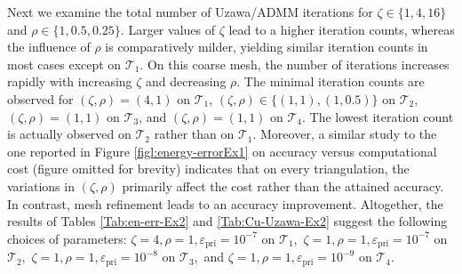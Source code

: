\documentclass[a4paper,11pt]{article}
\theoremstyle{definition}
\theoremstyle{remark}
\numberwithin{equation}{section}
\newcommand{\calT}{\mathcal{T}}
\begin{document}
\begin{table}[htb]
\centering
{}
\caption{Total number of Uzawa/ADMM iterations on the three triangulations and for various choices of the Uzawa/ADMM parameters: $\zeta\in\{1,4,16\}$, $\rho\in\{1,0.5,0.25\}$, $\varepsilon_{\text{pri}} \in \{10^{-6},10^{-7},10^{-8},10^{-9}\}$.}
\label{Tab:Cu-Uzawa-Ex2}
\end{table}


Next we examine the total number of Uzawa/ADMM iterations for $\zeta \in \{1,4,16\}$ and $\rho \in \{1,0.5,0.25\}$. Larger values of $\zeta$ lead to a higher iteration counts, whereas the influence of $\rho$ is comparatively milder, yielding similar iteration counts in most cases except on $\mathcal{T}_1$. On this coarse mesh, the number of iterations increases rapidly with increasing $\zeta$ and decreasing $\rho$. The minimal iteration counts are observed for $(\zeta,\rho) = (4,1)$ on $\mathcal{T}_1$, $(\zeta,\rho) \in\{(1,1),(1,0.5)\}$ on $\mathcal{T}_2$,   $(\zeta,\rho) = (1,1)$ on $\mathcal{T}_3$, and $(\zeta,\rho) = (1,1)$  on $\mathcal{T}_4$. The lowest iteration count is actually observed on $\mathcal{T}_2$ rather than on $\mathcal{T}_1$. 
Moreover, a similar study to the one reported in Figure \ref{figl:energy-errorEx1}  on accuracy versus computational cost (figure omitted for brevity) indicates that on every triangulation, the variations in $(\zeta,\rho)$ primarily affect the cost rather than the attained accuracy. In contrast, mesh refinement leads to an accuracy improvement. 
Altogether, the results of Tables \ref{Tab:en-err-Ex2} and \ref{Tab:Cu-Uzawa-Ex2}  suggest the following choices of parameters: $\zeta=4, \rho=1,  \varepsilon_{\text{pri}} = 10^{-7}$  on $\calT_1,$ $\zeta=1, \rho=1 ,  \varepsilon_{\text{pri}} = 10^{-7}$ on $\calT_2,$ $\zeta=1, \rho=1 ,  \varepsilon_{\text{pri}} = 10^{-8}$ on $\calT_3,$   and $\zeta=1, \rho=1,  \varepsilon_{\text{pri}} = 10^{-9} $  on $\calT_4.$ 
\end{document}
